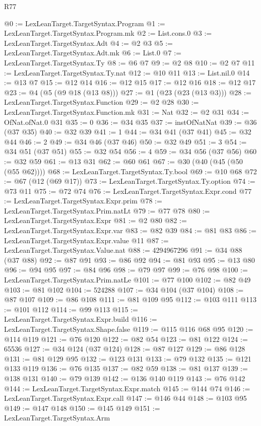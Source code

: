 \begin{lexlean}{R77}
\begin{coremodule}
@0 := LexLeanTarget.TargetSyntax.Program
@1 := LexLeanTarget.TargetSyntax.Program.mk
@2 := List.cons.{0}
@3 := LexLeanTarget.TargetSyntax.Adt
@4 := @2 @3
@5 := LexLeanTarget.TargetSyntax.Adt.mk
@6 := List.{0}
@7 := LexLeanTarget.TargetSyntax.Ty
@8 := @6 @7
@9 := @2 @8
@10 := @2 @7
@11 := LexLeanTarget.TargetSyntax.Ty.nat
@12 := @10 @11
@13 := List.nil.{0}
@14 := @13 @7
@15 := @12 @14
@16 := @12 @15
@17 := @12 @16
@18 := @12 @17
@23 := @4 (@5 (@9 @18 (@13 @8)))
@27 := @1 (@23 (@23 (@13 @3)))
@28 := LexLeanTarget.TargetSyntax.Function
@29 := @2 @28
@30 := LexLeanTarget.TargetSyntax.Function.mk
@31 := Nat
@32 := @2 @31
@34 := OfNat.ofNat.{0} @31
@35 := 0
@36 := @34 @35
@37 := instOfNatNat
@39 := @36 (@37 @35)
@40 := @32 @39
@41 := 1
@44 := @34 @41 (@37 @41)
@45 := @32 @44
@46 := 2
@49 := @34 @46 (@37 @46)
@50 := @32 @49
@51 := 3
@54 := @34 @51 (@37 @51)
@55 := @32 @54
@56 := 4
@59 := @34 @56 (@37 @56)
@60 := @32 @59
@61 := @13 @31
@62 := @60 @61
@67 := @30 (@40 (@45 (@50 (@55 @62))))
@68 := LexLeanTarget.TargetSyntax.Ty.bool
@69 := @10 @68
@72 := @67 (@12 (@69 @17))
@73 := LexLeanTarget.TargetSyntax.Ty.option
@74 := @73 @11
@75 := @72 @74
@76 := LexLeanTarget.TargetSyntax.Expr.cond
@77 := LexLeanTarget.TargetSyntax.Expr.prim
@78 := LexLeanTarget.TargetSyntax.Prim.natLt
@79 := @77 @78
@80 := LexLeanTarget.TargetSyntax.Expr
@81 := @2 @80
@82 := LexLeanTarget.TargetSyntax.Expr.var
@83 := @82 @39
@84 := @81 @83
@86 := LexLeanTarget.TargetSyntax.Expr.value @11
@87 := LexLeanTarget.TargetSyntax.Value.nat
@88 := 4294967296
@91 := @34 @88 (@37 @88)
@92 := @87 @91
@93 := @86 @92
@94 := @81 @93
@95 := @13 @80
@96 := @94 @95
@97 := @84 @96
@98 := @79 @97
@99 := @76 @98
@100 := LexLeanTarget.TargetSyntax.Prim.natLe
@101 := @77 @100
@102 := @82 @49
@103 := @81 @102
@104 := 524288
@107 := @34 @104 (@37 @104)
@108 := @87 @107
@109 := @86 @108
@111 := @81 @109 @95
@112 := @103 @111
@113 := @101 @112
@114 := @99 @113
@115 := LexLeanTarget.TargetSyntax.Expr.build
@116 := LexLeanTarget.TargetSyntax.Shape.false
@119 := @115 @116 @68 @95
@120 := @114 @119
@121 := @76 @120
@122 := @82 @54
@123 := @81 @122
@124 := 65536
@127 := @34 @124 (@37 @124)
@128 := @87 @127
@129 := @86 @128
@131 := @81 @129 @95
@132 := @123 @131
@133 := @79 @132
@135 := @121 @133 @119
@136 := @76 @135
@137 := @82 @59
@138 := @81 @137
@139 := @138 @131
@140 := @79 @139
@142 := @136 @140 @119
@143 := @76 @142
@144 := LexLeanTarget.TargetSyntax.Expr.match
@145 := @144 @74
@146 := LexLeanTarget.TargetSyntax.Expr.call
@147 := @146 @44
@148 := @103 @95
@149 := @147 @148
@150 := @145 @149
@151 := LexLeanTarget.TargetSyntax.Arm

\end{coremodule}
\end{lexlean}
